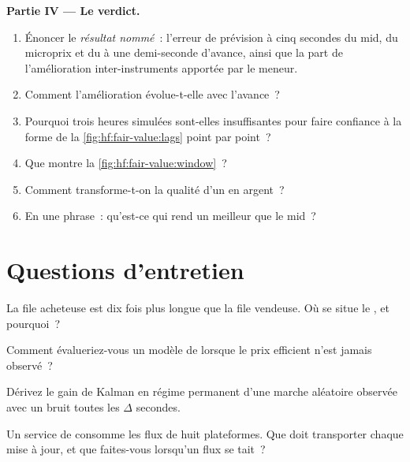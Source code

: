 \begin{problem}
\medskip\noindent\textbf{Partie IV --- Le verdict.}
\begin{enumerate}[resume]
\item Énoncer le \emph{résultat nommé}~: l'erreur de prévision à cinq secondes du mid, du microprix et du  à
une demi-seconde d'avance, ainsi que la part de l'amélioration inter-instruments apportée par le meneur.
\item Comment l'amélioration évolue-t-elle avec l'avance~?
\item Pourquoi trois heures simulées sont-elles insuffisantes pour faire confiance à la forme de la \cref{fig:hf:fair-value:lags} point par point~?
\item Que montre la \cref{fig:hf:fair-value:window}~?
\item Comment transforme-t-on la qualité d'un  en argent~?
\item En une phrase~: qu'est-ce qui rend un  meilleur que le mid~?
\end{enumerate}
\end{problem}

\section{Questions d'entretien}

\begin{interviewq}\label{iq:hf:fair-value:1}
La file acheteuse est dix fois plus longue que la file vendeuse. Où se situe le , et pourquoi~?
\end{interviewq}

\begin{interviewq}\label{iq:hf:fair-value:2}
Comment évalueriez-vous un modèle de  lorsque le prix efficient n'est jamais observé~?
\end{interviewq}

\begin{interviewq}\label{iq:hf:fair-value:3}
Dérivez le gain de Kalman en régime permanent d'une marche aléatoire observée avec un bruit toutes les $\Delta$ secondes.
\end{interviewq}

\begin{interviewq}\label{iq:hf:fair-value:4}
Un service de  consomme les flux de huit plateformes. Que doit transporter chaque mise à jour, et que faites-vous lorsqu'un flux se tait~?
\end{interviewq}

